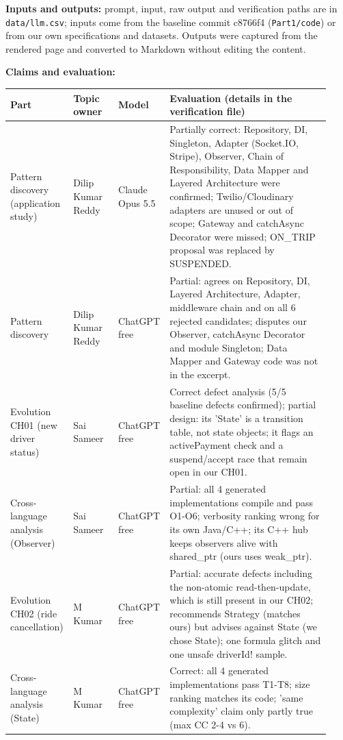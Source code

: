 \documentclass[11pt,a4paper]{article}
\begin{document}
\textbf{Inputs and outputs:} prompt, input, raw output and verification paths are in \texttt{data/llm.csv}; inputs come from the baseline
commit c8766f4 (\texttt{Part1/code}) or from our own specifications and datasets. Outputs were captured from the rendered page and converted
to Markdown without editing the content.

\textbf{Claims and evaluation:}
\begin{longtable}{@{}P{0.17\linewidth}P{0.14\linewidth}P{0.12\linewidth}P{0.5\linewidth}@{}}\toprule Part & Topic owner & Model & Evaluation (details in the verification file)\\\midrule\endhead
Pattern discovery (application study) & Dilip Kumar Reddy & Claude Opus 5.5 & Partially correct: Repository, DI, Singleton, Adapter (Socket.IO, Stripe), Observer, Chain of Responsibility, Data Mapper and Layered Architecture were confirmed; Twilio/Cloudinary adapters are unused or out of scope; Gateway and catchAsync Decorator were missed; ON\_TRIP proposal was replaced by SUSPENDED. \\
Pattern discovery & Dilip Kumar Reddy & ChatGPT free & Partial: agrees on Repository, DI, Layered Architecture, Adapter, middleware chain and on all 6 rejected candidates; disputes our Observer, catchAsync Decorator and module Singleton; Data Mapper and Gateway code was not in the excerpt. \\
Evolution CH01 (new driver status) & Sai Sameer & ChatGPT free & Correct defect analysis (5/5 baseline defects confirmed); partial design: its 'State' is a transition table, not state objects; it flags an activePayment check and a suspend/accept race that remain open in our CH01. \\
Cross-language analysis (Observer) & Sai Sameer & ChatGPT free & Partial: all 4 generated implementations compile and pass O1-O6; verbosity ranking wrong for its own Java/C++; its C++ hub keeps observers alive with shared\_ptr (ours uses weak\_ptr). \\
Evolution CH02 (ride cancellation) & M Kumar & ChatGPT free & Partial: accurate defects including the non-atomic read-then-update, which is still present in our CH02; recommends Strategy (matches ours) but advises against State (we chose State); one formula glitch and one unsafe driverId! sample. \\
Cross-language analysis (State) & M Kumar & ChatGPT free & Correct: all 4 generated implementations pass T1-T8; size ranking matches its code; 'same complexity' claim only partly true (max CC 2-4 vs 6). \\

\end{longtable}
\end{document}
